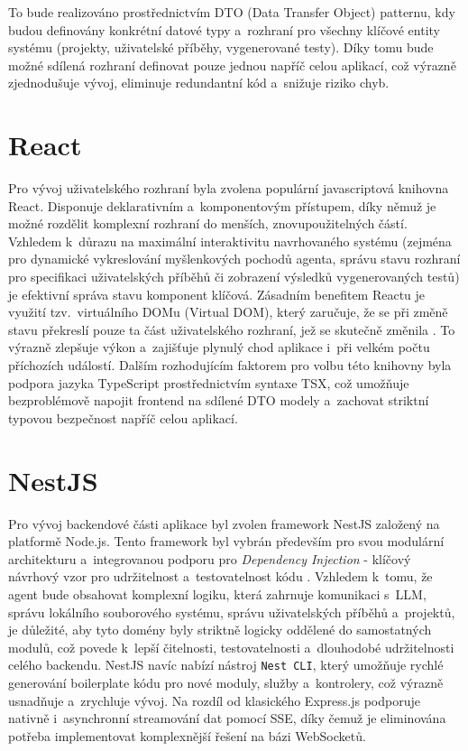 \documentclass[czech, ing, kiv, he, iso690numb, viewonly]{fasthesis}
\begin{document}
To bude realizováno prostřednictvím DTO (Data Transfer Object) patternu, kdy budou definovány konkrétní 
datové typy a~rozhraní pro všechny klíčové entity systému (projekty, uživatelské příběhy, vygenerované testy).
Díky tomu bude možné sdílená rozhraní definovat pouze jednou napříč celou aplikací, 
což výrazně zjednodušuje vývoj, eliminuje redundantní kód a~snižuje riziko chyb.

\section{React}
Pro vývoj uživatelského rozhraní byla zvolena populární javascriptová knihovna React. 
Disponuje deklarativním a~komponentovým přístupem, díky němuž je možné rozdělit komplexní rozhraní do menších, znovupoužitelných částí.
Vzhledem k~důrazu na maximální interaktivitu navrhovaného systému (zejména pro dynamické vykreslování myšlenkových pochodů agenta, 
správu stavu rozhraní pro specifikaci uživatelských příběhů či zobrazení výsledků vygenerovaných testů) je efektivní správa stavu 
komponent klíčová. Zásadním benefitem Reactu je využití tzv.~virtuálního DOMu (Virtual DOM), který zaručuje, 
že se při změně stavu překreslí pouze ta část uživatelského rozhraní, jež se skutečně změnila \cite{chen2019front}. To výrazně 
zlepšuje výkon a~zajišťuje plynulý chod aplikace i~při velkém počtu příchozích událostí.
Dalším rozhodujícím faktorem pro volbu této knihovny byla podpora jazyka TypeScript prostřednictvím syntaxe TSX,
což umožňuje bezproblémově napojit frontend na sdílené DTO modely a~zachovat striktní typovou bezpečnost napříč celou aplikací.

\section{NestJS}
Pro vývoj backendové části aplikace byl zvolen framework NestJS založený na platformě Node.js.
Tento framework byl vybrán především pro svou modulární architekturu a~integrovanou podporu pro \textit{Dependency Injection} -
klíčový návrhový vzor pro udržitelnost a~testovatelnost kódu \cite{munirov2025nestjs}. Vzhledem k~tomu, že agent bude obsahovat komplexní logiku,
která zahrnuje komunikaci s~LLM, správu lokálního souborového systému, správu uživatelských příběhů a~projektů, 
je důležité, aby tyto domény byly striktně logicky oddělené do samostatných modulů, což povede k~lepší čitelnosti, testovatelnosti 
a~dlouhodobé udržitelnosti celého backendu. NestJS navíc nabízí nástroj \texttt{Nest CLI}, který umožňuje 
rychlé generování boilerplate kódu pro nové moduly, služby a~kontrolery, což výrazně usnadňuje a~zrychluje vývoj.
Na rozdíl od klasického Express.js podporuje nativně i~asynchronní streamování dat pomocí SSE, díky čemuž je eliminována 
potřeba implementovat komplexnější řešení na bázi WebSocketů. 
\end{document}
